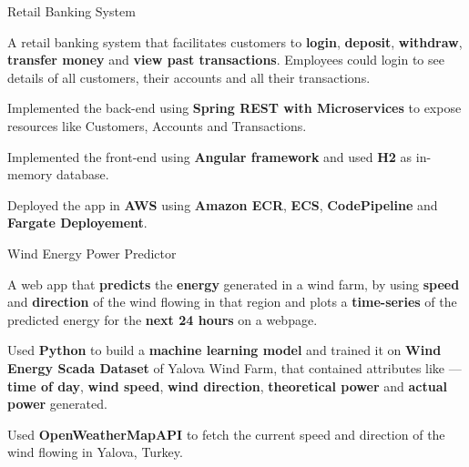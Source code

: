 
\begin{cventries}

  \cventry
    {} %
    { Retail Banking System \hspace{1.5mm} \href{https://github.com/bullet-ant/Retail-Banking-System-SpringBoot}{\faGithub}} %
    { } %
    {} %
    {
      \begin{cvitems} %
      	\item {A retail banking system that facilitates customers to \textbf{login}, \textbf{deposit}, \textbf{withdraw}, \textbf{transfer money} and \textbf{view past transactions}. Employees could login to see details of all customers, their accounts and all their transactions.}
		\item {Implemented the back-end using \textbf{Spring REST with Microservices} to expose resources like Customers, Accounts and Transactions.}
		\item {Implemented the front-end using \textbf{Angular framework} and used \textbf{H2} as in-memory database.}
		\item {Deployed the app in \textbf{AWS} using \textbf{Amazon ECR}, \textbf{ECS}, \textbf{CodePipeline} and \textbf{Fargate Deployement}.}
      \end{cvitems}
    }
    
  \cventry
    {} %
    {Wind Energy Power Predictor \hspace{1.5mm} \href{https://github.com/bullet-ant/Wind-Energy-Power-Prediction}{\faGithub}} %
    {} %
    {} %
    {
      \begin{cvitems} %
        \item {A web app that \textbf{predicts} the \textbf{energy} generated in a wind farm, by using \textbf{speed} and \textbf{direction} of the wind flowing in that region and plots a \textbf{time-series} of the predicted energy for the \textbf{next 24 hours} on a webpage.} 
        \item { Used \textbf{Python} to build a \textbf{machine learning model} and trained it on \textbf{Wind Energy Scada Dataset} of Yalova Wind Farm, that contained attributes like --- \textbf{time of day}, \textbf{wind speed}, \textbf{wind direction}, \textbf{theoretical power} and \textbf{actual power} generated.}
		\item {Used \textbf{OpenWeatherMapAPI} to fetch the current speed and direction of the wind flowing in Yalova, Turkey.}
      \end{cvitems}
    }

\end{cventries}